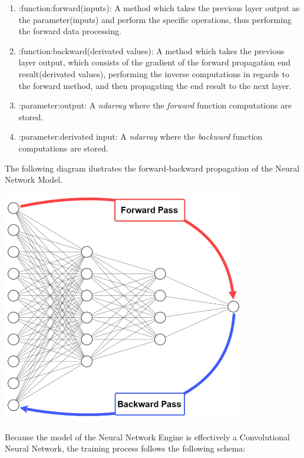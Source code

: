 \begin{enumerate}
	\item :function:forward(inputs): A method which takes the previous layer output as the parameter(inputs)
	and perform the specific operations, thus performing the forward data processing.
	\item :function:backward(derivated values): A method which takes the previous layer output, which consists
	of the gradient of the forward propagation end result(derivated values), performing the inverse
	computations in regards to the forward method, and then propagating the end result to the next layer.
	\item :parameter:output: A \textit{ndarray} where the \textit{forward} function computations are stored.
	\item :parameter:derivated input: A \textit{ndarray} where the \textit{backward} function computations are stored.

\end{enumerate}

The following diagram ilustrates the forward-backward propagation of the Neural Network Model.

\begin{center}
	\centering
	\includegraphics[width = 4.2in]{images/fwbw.png}
 \centerline{}
\label{data_flow}
\end{center}

Because the model of the Neural Network Engine is effectively a Convolutional Neural Network, the training process follows
the following schema:


